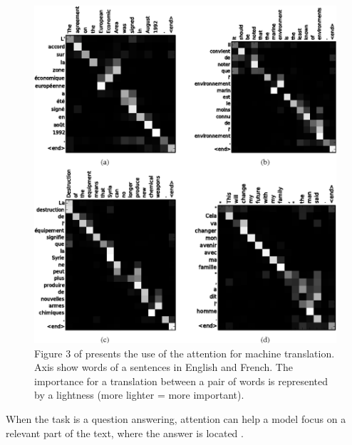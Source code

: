\begin{figure}[ht]
\includegraphics[width=0.7\columnwidth]{../img/attention_translate}
\caption{Figure 3 of \citep{Bahdanau} presents the use of the attention for machine translation. Axis show words of a sentences in English and French. The importance for a translation between a pair of words is represented by a lightness (more lighter = more important).
}
\label{pic:att_trans}
\end{figure}
When the task is a question answering, attention can help a model focus on a relevant part of the text, where the answer is located \citep{Santos2016}.


